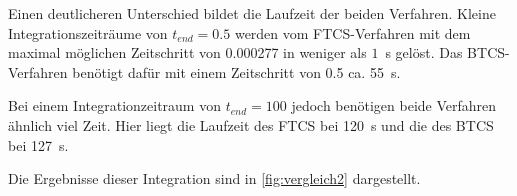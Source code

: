 Einen deutlicheren Unterschied bildet die Laufzeit der beiden Verfahren. Kleine Integrationszeiträume von $t_{end}=0.5$ werden vom FTCS-Verfahren mit dem maximal möglichen Zeitschritt von 0.000277 in weniger als $1$~s gelöst. Das BTCS-Verfahren benötigt dafür mit einem Zeitschritt von 0.5 ca. 55~s.

Bei einem Integrationzeitraum von $t_{end}=100$ jedoch benötigen beide Verfahren ähnlich viel Zeit. Hier liegt die Laufzeit des FTCS bei 120~s und die des BTCS bei 127~s.

Die Ergebnisse dieser Integration sind in \cref{fig:vergleich2} dargestellt.

